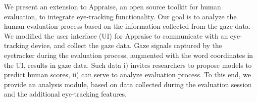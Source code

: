 We present an extension to Appraise, an open source toolkit for human evaluation, to integrate eye-tracking functionality. Our goal is to analyze the human evaluation process based on the information collected from the gaze data. We modified the user interface (UI) for Appraise to communicate with an eye-tracking device, and collect the gaze data. Gaze signals captured by the eyetracker during the evaluation process, augmented with the word coordinates in the UI, results in gaze data. Such data i) invites researchers to propose models to predict human scores, ii) can serve to analyze evaluation process. To this end, we provide an analysis module, based on data collected during the evaluation session and the additional eye-tracking features.
